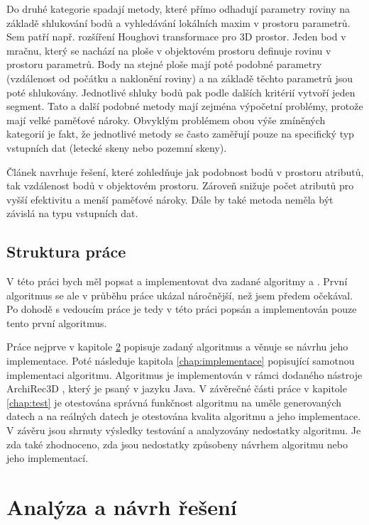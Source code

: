 \documentclass[11pt,twoside,a4paper]{book}
\begin{document}
Do druhé kategorie spadají metody, které přímo odhadují parametry roviny na základě shlukování bodů a vyhledávání lokálních maxim v prostoru parametrů. Sem patří např. rozšíření Houghovi transformace pro 3D prostor. Jeden bod v mračnu, který se nachází na ploše v objektovém prostoru definuje rovinu v prostoru parametrů. Body na stejné ploše mají poté podobné parametry (vzdálenost od počátku a naklonění roviny) a na základě těchto parametrů jsou poté shlukovány. Jednotlivé shluky bodů pak podle dalších kritérií vytvoří jeden segment. Tato a další podobné metody mají zejména výpočetní problémy, protože mají velké paměťové nároky. Obvyklým problémem obou výše zmíněných kategorií je fakt, že jednotlivé metody se často zaměřují pouze na specifický typ vstupních dat (letecké skeny nebo pozemní skeny).

Článek \cite{Seg01} navrhuje řešení, které zohledňuje jak podobnost bodů v prostoru atributů, tak vzdálenost bodů v objektovém prostoru. Zároveň snižuje počet atributů pro vyšší efektivitu a menší paměťové nároky. Dále by také metoda neměla být závislá na typu vstupních dat.


\section{Struktura práce}

V této práci bych měl popsat a implementovat dva zadané algoritmy \cite{Seg01} a \cite{Seg02}. První algoritmus se ale v průběhu práce ukázal náročnější, než jsem předem očekával. Po dohodě s vedoucím práce je tedy v této práci popsán a implementován pouze tento první algoritmus.  

Práce nejprve v kapitole \ref{chap:analyza} popisuje zadaný algoritmus \cite{Seg01} a věnuje se návrhu jeho implementace. Poté následuje kapitola \ref{chap:implementace} popisující samotnou implementaci algoritmu. Algoritmus je implementován v rámci dodaného nástroje ArchiRec3D \cite{AR3D}, který je psaný v jazyku Java. V závěrečné části práce v kapitole \ref{chap:test} je otestována správná funkčnost algoritmu na uměle generovaných datech a na reálných datech je otestována kvalita algoritmu a jeho implementace. V závěru jsou shrnuty výsledky testování a analyzovány nedostatky algoritmu. Je zda také zhodnoceno, zda jsou nedostatky způsobeny návrhem algoritmu nebo jeho implementací.


\chapter{Analýza a návrh řešení}
\label{chap:analyza}
\end{document}
